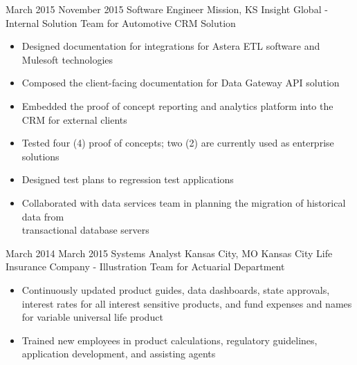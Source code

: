 \Experience
{March 2015}
{November 2015}
{Software Engineer}
{Mission, KS}
{Insight Global - Internal Solution Team for Automotive CRM Solution}
{\begin{itemize}
     \item Designed documentation for integrations for Astera ETL software and Mulesoft
     technologies
     \item Composed the client-facing documentation for Data Gateway API solution
     \item Embedded the proof of concept reporting and analytics platform into the CRM for
     external clients
     \item Tested four (4) proof of concepts; two (2) are currently used as enterprise solutions
     \item Designed test plans to regression test applications
     \item Collaborated with data services team in planning the migration of historical data from
     \\transactional database servers
\end{itemize}}

\vspace*{0.05 in}

\Experience
{March 2014}
{March 2015}
{Systems Analyst}
{Kansas City, MO}
{Kansas City Life Insurance Company - Illustration Team for Actuarial Department}
{\begin{itemize}
    \item Continuously updated product guides, data dashboards, state approvals, interest rates
    for all interest sensitive products, and fund expenses and names for variable universal
    life product
    \item Trained new employees in product calculations, regulatory guidelines, application
    development, and assisting agents
\end{itemize}}